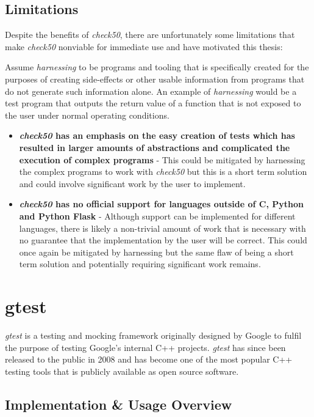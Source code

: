 \documentclass[hidelinks, 12pt]{extreport}
\begin{document}
\subsection{Limitations}

Despite the benefits of \textit{check50}, there are unfortunately some limitations that make \textit{check50} nonviable for immediate use and have motivated this thesis:

Assume \textit{harnessing} to be programs and tooling that is specifically created for the purposes of creating side-effects or other usable information from programs that do not generate such information alone. An example of \textit{harnessing} would be a test program that outputs the return value of a function that is not exposed to the user under normal operating conditions. 

\begin{itemize}
	\item \textbf{\textit{check50} has an emphasis on the easy creation of tests which has resulted in larger amounts of abstractions and complicated the execution of complex programs} - This could be mitigated by harnessing the complex programs to work with \textit{check50} but this is a short term solution and could involve significant work by the user to implement.
	\item \textbf{\textit{check50} has no official support for languages outside of C, Python and Python Flask} - Although support can be implemented for different languages, there is likely a non-trivial amount of work that is necessary with no guarantee that the implementation by the user will be correct. This could once again be mitigated by harnessing but the same flaw of being a short term solution and potentially requiring significant work remains.
\end{itemize}

\clearpage
\section{gtest}

\textit{gtest} is a testing and mocking framework originally designed by Google to fulfil the purpose of testing Google's internal C++ projects. \textit{gtest} has since been released to the public in 2008 and has become one of the most popular C++ testing tools that is publicly available as open source software.

\subsection{Implementation \& Usage Overview}
\end{document}
